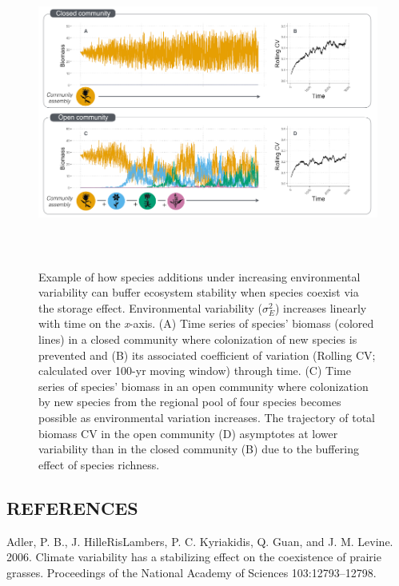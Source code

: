 \documentclass[12pt,]{article}
\begin{document}
\begin{figure}[!ht]
  \centering
      \includegraphics[height=4in]{./components/coexistence_stability_infographic_v2.png}
  \caption{Example of how species additions under increasing environmental variability can buffer ecosystem stability when species coexist via the storage effect. Environmental variability ($\sigma^2_E$) increases linearly with time on the \emph{x}-axis. (A) Time series of species' biomass (colored lines) in a closed community where colonization of new species is prevented and (B) its associated coefficient of variation (Rolling CV; calculated over 100-yr moving window) through time. (C) Time series of species' biomass in an open community where colonization by new species from the regional pool of four species becomes possible as environmental variation increases. The trajectory of total biomass CV in the open community (D) asymptotes at lower variability than in the closed community (B) due to the buffering effect of species richness.}
\end{figure}

\newpage{}

\setlength{\parindent}{0ex} \singlespacing

\subsection*{REFERENCES}\label{references}

Adler, P. B., J. HilleRisLambers, P. C. Kyriakidis, Q. Guan, and J. M.
Levine. 2006. Climate variability has a stabilizing effect on the
coexistence of prairie grasses. Proceedings of the National Academy of
Sciences 103:12793--12798.
\end{document}
